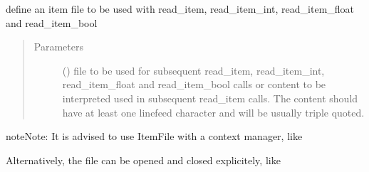 \documentclass[letterpaper,10pt,english]{sphinxmanual}
\begin{document}
\begin{fulllineitems}
\label{\detokenize{Reference:salabim.ItemFile}}
define an item file to be used with read\_item, read\_item\_int, read\_item\_float and read\_item\_bool
\begin{quote}\begin{description}
\item[{Parameters}] \leavevmode
{} () \textendash{} file to be used for subsequent read\_item, read\_item\_int, read\_item\_float and read\_item\_bool calls 
or 
content to be interpreted used in subsequent read\_item calls. The content should have at least one linefeed
character and will be usually  triple quoted.

\end{description}\end{quote}

\begin{sphinxadmonition}{note}{Note:}
It is advised to use ItemFile with a context manager, like

\begin{sphinxVerbatim}[commandchars=\\\{\}]
   
       
       
\end{sphinxVerbatim}

Alternatively, the file can be opened and closed explicitely, like

\begin{sphinxVerbatim}[commandchars=\\\{\}]
  
  
  
\end{sphinxVerbatim}


\end{sphinxadmonition}
\end{fulllineitems}
\end{document}
